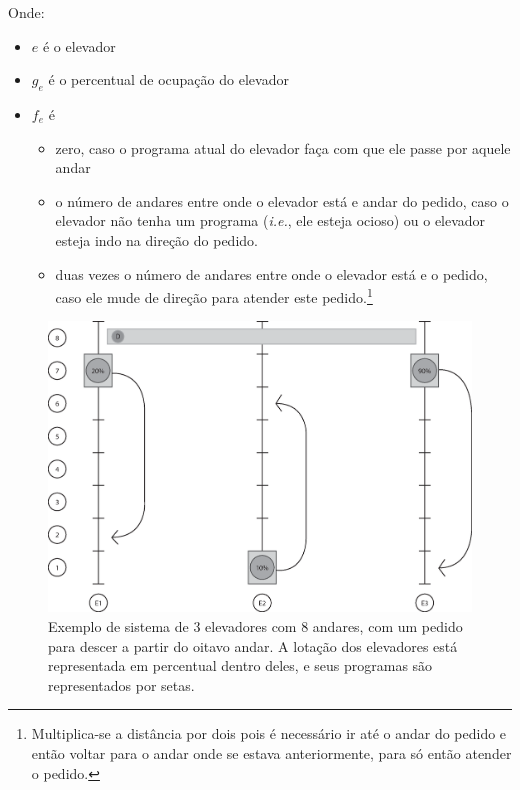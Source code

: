 Onde:
\begin{itemize}
\item \textbf{$e$} é o elevador
\item \textbf{$g_{e}$} é o percentual de ocupação do elevador
\item \textbf{$f_{e}$} é
  \begin{itemize}
    \item zero, caso o programa atual do elevador faça com que ele passe por
      aquele andar
    \item o número de andares entre onde o elevador está e andar do pedido, caso o
      elevador não tenha um programa (\textit{i.e.}, ele esteja ocioso) ou o
      elevador esteja indo na direção do pedido.
    \item duas vezes o número de andares entre onde o elevador está e o pedido,
      caso ele mude de direção para atender este pedido.\footnote{Multiplica-se
        a distância por dois pois é necessário ir até o andar do pedido e então
        voltar para o andar onde se estava anteriormente, para só então atender
        o pedido.}
  \end{itemize}
\end{itemize}

\begin{figure}[htb!]
  \centering
  \includegraphics[scale=0.6]{img/elevator_example1.eps}
  \caption{Exemplo de sistema de 3 elevadores com 8 andares, com um pedido para
    descer a partir do oitavo andar. A lotação dos elevadores está representada
    em percentual dentro deles, e seus programas são representados por setas.}
  \label{fig:elevadores-1}
\end{figure}

